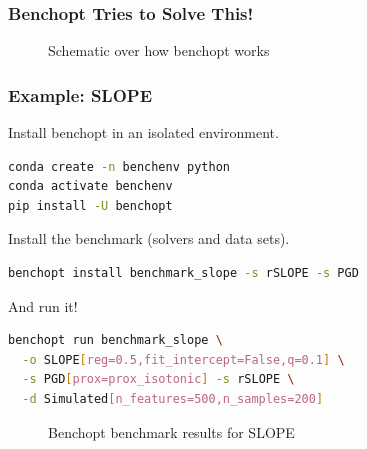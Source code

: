 \documentclass[10pt]{beamer}
\begin{document}
\begin{frame}[c]
  \frametitle{Benchopt Tries to Solve This!}

  \begin{figure}[htpb]
    \centering
    \caption{%
      Schematic over how benchopt works
    }
  \end{figure}
\end{frame}

\begin{frame}[fragile]
  \frametitle{Example: SLOPE}

  Install benchopt in an isolated environment.
  \begin{lstlisting}[language=bash,basicstyle=\ttfamily\small]
conda create -n benchenv python
conda activate benchenv
pip install -U benchopt
\end{lstlisting}

  \pause\medskip

  Install the benchmark (solvers and data sets).
  \begin{lstlisting}[language=bash,basicstyle=\ttfamily\small]
benchopt install benchmark_slope -s rSLOPE -s PGD
\end{lstlisting}

  \pause\medskip

  And run it!

  \begin{lstlisting}[language=bash,basicstyle=\ttfamily\small]
benchopt run benchmark_slope \
  -o SLOPE[reg=0.5,fit_intercept=False,q=0.1] \
  -s PGD[prox=prox_isotonic] -s rSLOPE \
  -d Simulated[n_features=500,n_samples=200]
\end{lstlisting}

\end{frame}

\begin{frame}[c]
  \begin{figure}[htpb]
    \centering
    \caption{%
      Benchopt benchmark results for SLOPE
    }
  \end{figure}
\end{frame}
\end{document}
